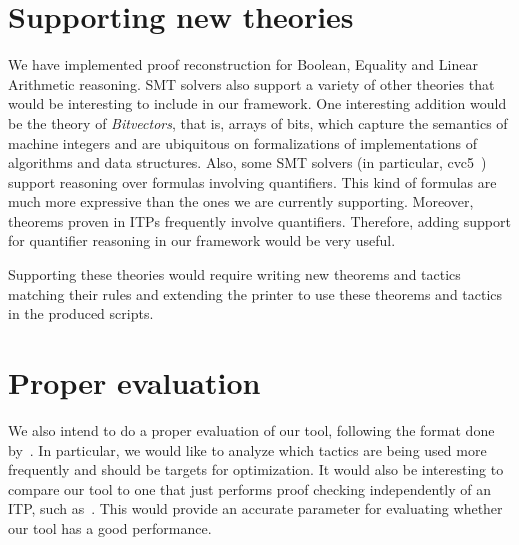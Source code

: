 \section{Supporting new theories}

We have implemented proof reconstruction for Boolean,
Equality and Linear Arithmetic reasoning. SMT solvers
also support a variety of other theories that would be interesting
to include in our framework. One interesting addition would be the theory of
\textit{Bitvectors}, that is, arrays of bits, which capture
the semantics of machine integers and are ubiquitous on formalizations
of implementations of algorithms and data structures. Also,
some SMT solvers (in particular, cvc5~\cite{quantElim}) support
reasoning over formulas involving quantifiers. This kind of
formulas are much more expressive than the ones we are currently
supporting. Moreover, theorems proven in ITPs frequently involve
quantifiers. Therefore, adding support for quantifier reasoning
in our framework would be very useful.

Supporting these theories would require writing new
theorems and tactics matching their rules and extending the
printer to use these theorems and tactics in the produced scripts.

\section{Proper evaluation}

We also intend to do a proper evaluation of our tool, following the format done by~\cite{carcara}. In particular, we would like to
analyze which tactics are being used more frequently and
should be targets for optimization. It would also be interesting
to compare our tool to one that just performs proof checking
independently of an ITP, such as~\cite{carcara}. This would provide
an accurate parameter for evaluating whether our tool has a good
performance.
